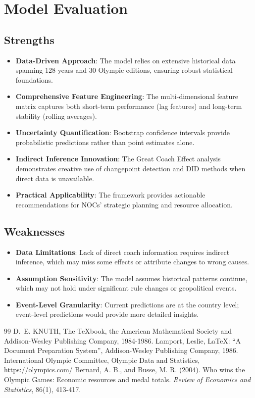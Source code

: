 \documentclass{mcmthesis}
\begin{document}
\section{Model Evaluation}
\subsection{Strengths}
\begin{itemize}
    \item \textbf{Data-Driven Approach}: The model relies on extensive historical data spanning 128 years and 30 Olympic editions, ensuring robust statistical foundations.
    \item \textbf{Comprehensive Feature Engineering}: The multi-dimensional feature matrix captures both short-term performance (lag features) and long-term stability (rolling averages).
    \item \textbf{Uncertainty Quantification}: Bootstrap confidence intervals provide probabilistic predictions rather than point estimates alone.
    \item \textbf{Indirect Inference Innovation}: The Great Coach Effect analysis demonstrates creative use of changepoint detection and DID methods when direct data is unavailable.
    \item \textbf{Practical Applicability}: The framework provides actionable recommendations for NOCs' strategic planning and resource allocation.
\end{itemize}

\subsection{Weaknesses}
\begin{itemize}
    \item \textbf{Data Limitations}: Lack of direct coach information requires indirect inference, which may miss some effects or attribute changes to wrong causes.
    \item \textbf{Assumption Sensitivity}: The model assumes historical patterns continue, which may not hold under significant rule changes or geopolitical events.
    \item \textbf{Event-Level Granularity}: Current predictions are at the country level; event-level predictions would provide more detailed insights.
\end{itemize}

\begin{thebibliography}{99}
 D.~E. KNUTH, The \TeX{}book, the American Mathematical Society and Addison-Wesley Publishing Company, 1984-1986.
 Lamport, Leslie, \LaTeX{}: ``A Document Preparation System'', Addison-Wesley Publishing Company, 1986.
 International Olympic Committee, Olympic Data and Statistics, \url{https://olympics.com/}
 Bernard, A. B., and Busse, M. R. (2004). Who wins the Olympic Games: Economic resources and medal totals. \textit{Review of Economics and Statistics}, 86(1), 413-417.
\end{thebibliography}
\end{document}
